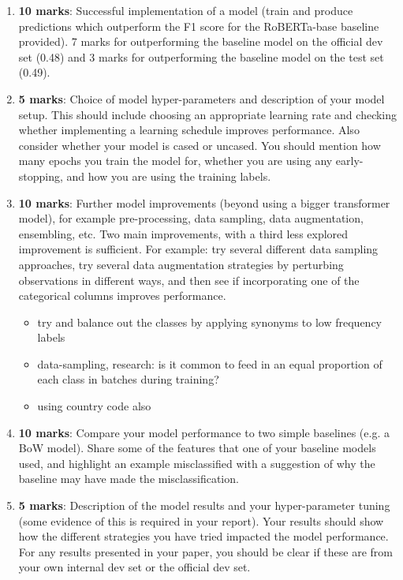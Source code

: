 \documentclass[11pt,a4paper]{article}
\begin{document}
\begin{enumerate}
    \item \textbf{10 marks}: Successful implementation of a model (train and produce predictions which outperform the F1 score for the RoBERTa-base baseline provided). 7 marks for outperforming the baseline model on the official dev set (0.48) and 3 marks for outperforming the baseline model on the test set (0.49).
    \item \textbf{5 marks}: Choice of model hyper-parameters and description of your model setup. This should include choosing an appropriate learning rate and checking whether implementing a learning schedule improves performance. Also consider whether your model is cased or uncased. You should mention how many epochs you train the model for, whether you are using any early-stopping, and how you are using the training labels.
    \item \textbf{10 marks}: Further model improvements (beyond using a bigger transformer model), for example pre-processing, data sampling, data augmentation, ensembling, etc. Two main improvements, with a third less explored improvement is sufficient. For example: try several different data sampling approaches, try several data augmentation strategies by perturbing observations in different ways, and then see if incorporating one of the categorical columns improves performance.
          \begin{itemize}
              \item try and balance out the classes by applying synonyms to low frequency labels
              \item data-sampling, research: is it common to feed in an equal proportion of each class in batches during training?
              \item using country code also
          \end{itemize}
    \item \textbf{10 marks}: Compare your model performance to two simple baselines (e.g. a BoW model). Share some of the features that one of your baseline models used, and highlight an example misclassified with a suggestion of why the baseline may have made the misclassification.
    \item \textbf{5 marks}: Description of the model results and your hyper-parameter tuning (some evidence of this is required in your report). Your results should show how the different strategies you have tried impacted the model performance. For any results presented in your paper, you should be clear if these are from your own internal dev set or the official dev set.
\end{enumerate}
\end{document}
